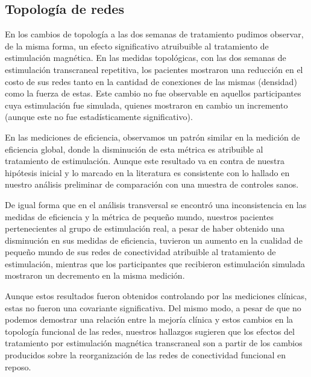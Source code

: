 \subsection{Topología de redes}
En los cambios de topología a las dos semanas de tratamiento pudimos observar, de la misma forma, un efecto significativo atruibuible al tratamiento de estimulación magnética. En las medidas topológicas, con las dos semanas de estimulación transcraneal repetitiva, los pacientes mostraron una reducción en el costo de sus redes tanto en la cantidad de conexiones de las mismas (densidad) como la fuerza de estas. Este cambio no fue observable en aquellos participantes cuya estimulación fue simulada, quienes mostraron en cambio un incremento (aunque este no fue estadísticamente significativo).\par
En las mediciones de eficiencia, observamos un patrón similar en la medición de eficiencia global, donde la disminución de esta métrica es atribuible al tratamiento de estimulación. Aunque este resultado va en contra de nuestra hipótesis inicial y lo marcado en la literatura \parencite{Wang2015a} es consistente con lo hallado en nuestro análisis preliminar de comparación con una muestra de controles sanos. \par
De igual forma que en el análisis transversal se encontró una inconsistencia en las medidas de eficiencia y la métrica de pequeño mundo, nuestros pacientes pertenecientes al grupo de estimulación real, a pesar de haber obtenido una disminución en sus medidas de eficiencia, tuvieron un aumento en la cualidad de pequeño mundo de sus redes de conectividad atribuible al tratamiento de estimulación, mientras que los participantes que recibieron estimulación simulada mostraron un decremento en la misma medición. \par
Aunque estos resultados fueron obtenidos controlando por las mediciones clínicas, estas no fueron una covariante significativa. Del mismo modo, a pesar de que no podemos demostrar una relación entre la mejoría clínica y estos cambios en la topología funcional de las redes, nuestros hallazgos sugieren que los efectos del tratamiento por estimulación magnética transcraneal son a partir de los cambios producidos sobre la reorganización de las redes de conectividad funcional en reposo.


